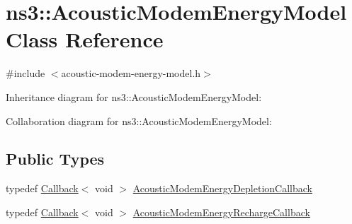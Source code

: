 \hypertarget{classns3_1_1AcousticModemEnergyModel}{}\section{ns3\+:\+:Acoustic\+Modem\+Energy\+Model Class Reference}
\label{classns3_1_1AcousticModemEnergyModel}


{\ttfamily \#include $<$acoustic-\/modem-\/energy-\/model.\+h$>$}



Inheritance diagram for ns3\+:\+:Acoustic\+Modem\+Energy\+Model\+:


Collaboration diagram for ns3\+:\+:Acoustic\+Modem\+Energy\+Model\+:
\subsection*{Public Types}
\begin{DoxyCompactItemize}
\item 
typedef \hyperlink{classns3_1_1Callback}{Callback}$<$ void $>$ \hyperlink{classns3_1_1AcousticModemEnergyModel_a04ad0c4c5ea21dc8d221761b734c317b}{Acoustic\+Modem\+Energy\+Depletion\+Callback}
\item 
typedef \hyperlink{classns3_1_1Callback}{Callback}$<$ void $>$ \hyperlink{classns3_1_1AcousticModemEnergyModel_a54a60baedb4014f67531e44ce079f1b1}{Acoustic\+Modem\+Energy\+Recharge\+Callback}
\end{DoxyCompactItemize}
